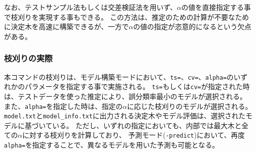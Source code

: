 なお、テストサンプル法もしくは交差検証法を用いず、$\alpha$の値を直接指定する事で枝刈りを実現する事もできる。
この方法は、推定のための計算が不要なために決定木を高速に構築できるが、一方で$\alpha$の値の指定が恣意的になるという欠点がある。




\subsubsection{枝刈りの実際}
本コマンドの枝刈りは、モデル構築モードにおいて、\verb|ts=|、\verb|cv=|、\verb|alpha=|のいずれかのパラメータを指定する事で実施される。
\verb|ts=|もしくは\verb|cv=|が指定された時は、テストデータを使った推定により、誤分類率最小のモデルが選択される。
また、\verb|alpha=|を指定した時は、指定の$\alpha$に応じた枝刈りのモデルが選択される。
\verb|model.txt|と\verb|model_info.txt|に出力される決定木やモデル評価は、選択されたモデルに基づいている。
ただし、いずれの指定においても、内部では最大木と全ての$\alpha$に対する枝刈りを計算しており、
予測モード(\verb|-predict|)において、再度\verb|alpha=|を指定することで、異なるモデルを用いた予測も可能となる。

